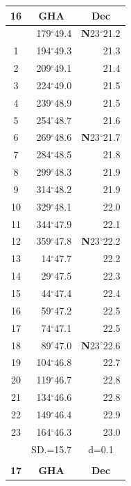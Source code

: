 \documentclass[10pt, a4paper]{report}
\begin{document}
\begin{scriptsize}
\noindent
\begin{tabular*}{0.2\textwidth}[t]{@{\extracolsep{\fill}}|c|rr|}
\hline
\multicolumn{1}{|c|}{\rule{0pt}{2.6ex}\textbf{16}} & \multicolumn{1}{c}{\textbf{GHA}} & \multicolumn{1}{c|}{\textbf{Dec}}\\
\hline\rule{0pt}{2.6ex}\noindent
0 & 179$^\circ$49.4 & \textbf{N}23$^\circ$21.2\\
1 & 194$^\circ$49.3 & 21.3\\
2 & 209$^\circ$49.1 & 21.4\\
3 & 224$^\circ$49.0 & \raisebox{0.24ex}{\boldmath$\cdot$~\boldmath$\cdot$~~}21.5\\
4 & 239$^\circ$48.9 & 21.5\\
5 & 254$^\circ$48.7 & 21.6\\[2Pt]
6 & 269$^\circ$48.6 & \textbf{N}23$^\circ$21.7\\
7 & 284$^\circ$48.5 & 21.8\\
8 & 299$^\circ$48.3 & 21.9\\
9 & 314$^\circ$48.2 & \raisebox{0.24ex}{\boldmath$\cdot$~\boldmath$\cdot$~~}21.9\\
10 & 329$^\circ$48.1 & 22.0\\
11 & 344$^\circ$47.9 & 22.1\\[2Pt]
12 & 359$^\circ$47.8 & \textbf{N}23$^\circ$22.2\\
13 & 14$^\circ$47.7 & 22.2\\
14 & 29$^\circ$47.5 & 22.3\\
15 & 44$^\circ$47.4 & \raisebox{0.24ex}{\boldmath$\cdot$~\boldmath$\cdot$~~}22.4\\
16 & 59$^\circ$47.2 & 22.5\\
17 & 74$^\circ$47.1 & 22.5\\[2Pt]
18 & 89$^\circ$47.0 & \textbf{N}23$^\circ$22.6\\
19 & 104$^\circ$46.8 & 22.7\\
20 & 119$^\circ$46.7 & 22.8\\
21 & 134$^\circ$46.6 & \raisebox{0.24ex}{\boldmath$\cdot$~\boldmath$\cdot$~~}22.8\\
22 & 149$^\circ$46.4 & 22.9\\
23 & 164$^\circ$46.3 & 23.0\\
\hline
\rule{0pt}{2.4ex} & \multicolumn{1}{c}{SD.=15.7} & \multicolumn{1}{c|}{d=0.1}\\
\hline
\multicolumn{1}{c}{}\\[-0.5ex]\hline
\multicolumn{1}{|c|}{\rule{0pt}{2.6ex}\textbf{17}} & \multicolumn{1}{c}{\textbf{GHA}} & \multicolumn{1}{c|}{\textbf{Dec}}\\

\end{tabular*}
\end{scriptsize}
\end{document}
